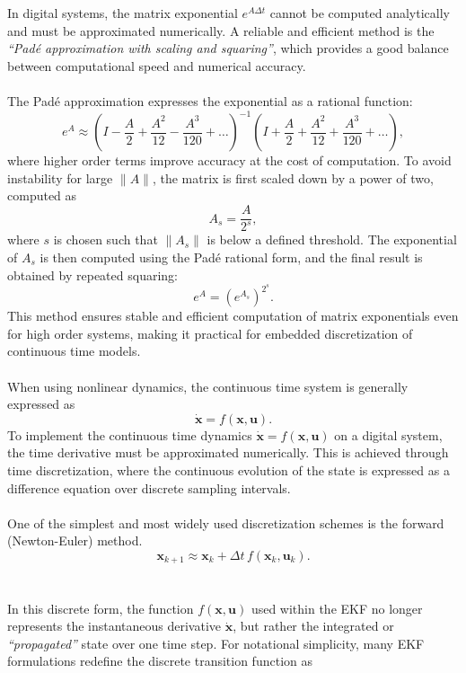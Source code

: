 \\ \\
In digital systems, the matrix exponential $e^{A\Delta t}$ cannot be computed analytically and must be approximated numerically. A reliable and efficient method is the \textit{``Padé approximation with scaling and squaring''}, which provides a good balance between computational speed and numerical accuracy.  
\\ \\
The Padé approximation expresses the exponential as a rational function:
$$
    e^{A} \approx \left(I - \frac{A}{2} + \frac{A^2}{12} - \frac{A^3}{120} + \dots \right)^{-1}
                  \left(I + \frac{A}{2} + \frac{A^2}{12} + \frac{A^3}{120} + \dots \right),
$$
where higher order terms improve accuracy at the cost of computation. To avoid instability for large $\|A\|$, the matrix is first scaled down by a power of two, computed as
$$
    A_s = \frac{A}{2^s},
$$
where $s$ is chosen such that $\|A_s\|$ is below a defined threshold. The exponential of $A_s$ is then computed using the Padé rational form, and the final result is obtained by repeated squaring:
$$
    e^A = (e^{A_s})^{2^s}.
$$
This method ensures stable and efficient computation of matrix exponentials even for high order systems, making it practical for embedded discretization of continuous time models.  
\\ \\
When using nonlinear dynamics, the continuous time system is generally expressed as
$$
    \dot{\mathbf{x}} = f(\mathbf{x}, \mathbf{u}).
$$
To implement the continuous time dynamics $\dot{\mathbf{x}} = f(\mathbf{x}, \mathbf{u})$ on a digital system, the time derivative must be approximated numerically. This is achieved through time discretization, where the continuous evolution of the state is expressed as a difference equation over discrete sampling intervals.  
\\ \\
One of the simplest and most widely used discretization schemes is the forward (Newton-Euler) method.
$$
    \mathbf{x}_{k+1} \approx \mathbf{x}_k + \Delta t \, f(\mathbf{x}_k, \mathbf{u}_k).
$$  
\\ \\
In this discrete form, the function $f(\mathbf{x}, \mathbf{u})$ used within the EKF no longer represents the instantaneous derivative $\dot{\mathbf{x}}$, but rather the integrated or \textit{``propagated''} state over one time step. For notational simplicity, many EKF formulations redefine the discrete transition function as
